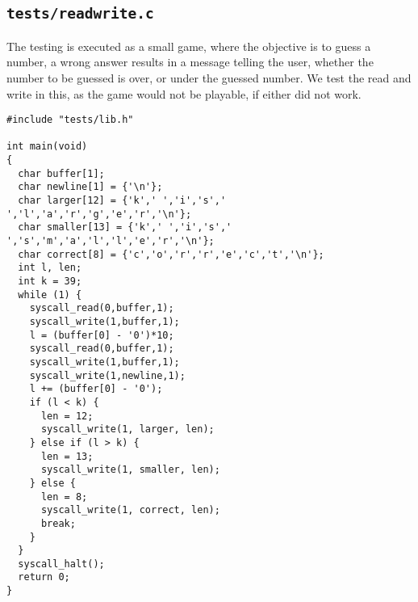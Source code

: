 \documentclass[a4paper,12pt]{article}
\begin{document}
\subsection{\texttt{tests/readwrite.c}}
The testing is executed as a small game, where the objective is to guess a number, a wrong answer results in a message telling the user, whether the number to be guessed is over, or under the guessed number. We test the read and write in this, as the game would not be playable, if either did not work.
\begin{lstlisting}
#include "tests/lib.h"

int main(void)
{
  char buffer[1];
  char newline[1] = {'\n'};
  char larger[12] = {'k',' ','i','s',' ','l','a','r','g','e','r','\n'};
  char smaller[13] = {'k',' ','i','s',' ','s','m','a','l','l','e','r','\n'};
  char correct[8] = {'c','o','r','r','e','c','t','\n'};
  int l, len;
  int k = 39;
  while (1) {
    syscall_read(0,buffer,1);
    syscall_write(1,buffer,1);
    l = (buffer[0] - '0')*10;
    syscall_read(0,buffer,1);
    syscall_write(1,buffer,1);
    syscall_write(1,newline,1);
    l += (buffer[0] - '0');
    if (l < k) {
      len = 12;
      syscall_write(1, larger, len);
    } else if (l > k) { 
      len = 13;
      syscall_write(1, smaller, len);
    } else {
      len = 8;
      syscall_write(1, correct, len);
      break;
    }
  }
  syscall_halt();
  return 0;
}
\end{lstlisting}
\end{document}
